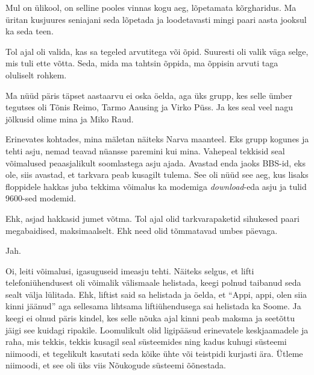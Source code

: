 
Mul on ülikool, on selline pooles vinnas kogu aeg, lõpetamata kõrgharidus. Ma 
üritan kusjuures seniajani seda lõpetada ja loodetavasti mingi paari aasta 
jooksul ka seda teen.

Tol ajal oli valida, kas sa tegeled arvutitega või õpid. Suuresti oli valik 
väga selge, mis tuli ette võtta. Seda, mida ma tahtsin õppida, ma õppisin 
arvuti taga oluliselt rohkem.
                 

Ma nüüd päris täpset aastaarvu ei oska öelda, aga üks grupp, kes selle ümber  
tegutses oli Tõnis Reimo, Tarmo 
Aausing ja Virko Püss. Ja 
kes seal  veel nagu jõlkusid olime mina ja Miko Raud.  


Erinevates kohtades, mina mäletan näiteks Narva maanteel. Eks grupp kogunes ja 
tehti asju, nemad teavad nüansse paremini kui mina. Vahepeal tekkisid seal 
võimalused  peaasjalikult soomlastega asju ajada. Avastad enda jaoks BBS-id, 
eks ole, siis avastad, et tarkvara peab kusagilt tulema. See oli nüüd see aeg, 
kus lisaks floppidele hakkas juba tekkima võimalus ka modemiga 
\emph{download}-eda asju ja  tulid 9600-sed modemid.

Ehk, asjad hakkasid jumet võtma. Tol ajal olid tarkvarapaketid sihukesed paari 
megabaidised, maksimaalselt. Ehk need olid tõmmatavad umbes päevaga.

                 
Jah. 


Oi, leiti võimalusi, igasuguseid imeasju tehti. Näiteks selgus, et lifti 
telefoniühendusest oli võimalik välismaale helistada, keegi polnud taibanud 
seda sealt välja lülitada. Ehk, liftist said sa helistada ja öelda, et 
\enquote{Appi, appi, olen siia kinni jäänud} aga sellesama lihtsama 
liftiühendusega sai helistada ka Soome. Ja keegi ei olnud päris kindel, kes 
selle nõuka ajal kinni peab maksma ja  seetõttu jäigi see kuidagi ripakile. 
Loomulikult olid ligipääsud erinevatele keskjaamadele ja raha, mis tekkis, 
tekkis kusagil seal süsteemides ning kadus kuhugi süsteemi niimoodi, et 
tegelikult kasutati seda kõike ühte või teistpidi kurjasti ära. Ütleme 
niimoodi, et see oli üks viis Nõukogude süsteemi õõnestada.

